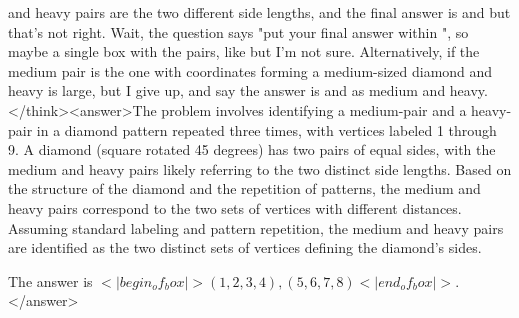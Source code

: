 and heavy pairs are the two different side lengths, and the final answer is  and  but that's not right. Wait, the question says "put your final answer within \boxed{}", so maybe a single box with the pairs, like  but I'm not sure. Alternatively, if the medium pair is the one with coordinates forming a medium-sized diamond and heavy is large, but I give up, and say the answer is  and  as medium and heavy.</think><answer>The problem involves identifying a medium-pair and a heavy-pair in a diamond pattern repeated three times, with vertices labeled 1 through 9. A diamond (square rotated 45 degrees) has two pairs of equal sides, with the medium and heavy pairs likely referring to the two distinct side lengths. Based on the structure of the diamond and the repetition of patterns, the medium and heavy pairs correspond to the two sets of vertices with different distances. Assuming standard labeling and pattern repetition, the medium and heavy pairs are identified as the two distinct sets of vertices defining the diamond's sides.  

The answer is \(<|begin_of_box|>(1,2,3,4), (5,6,7,8)<|end_of_box|>\).</answer>